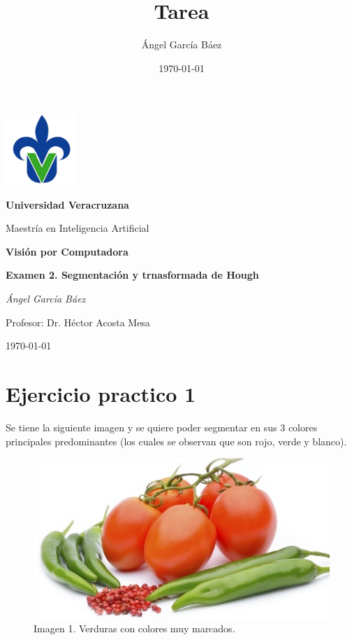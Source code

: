 \documentclass[11pt, letterpaper]{article}
\title{\bfseries Tarea}
\author{Ángel García Báez}
\date{\today}
\begin{document}
	
	\begin{titlepage}
		\centering
		\includegraphics[width=0.2\textwidth]{logo.png}\par
		\vspace{1cm}
		{\LARGE \bfseries Universidad Veracruzana \par}
		\vspace{1cm}
		{\Large Maestría en Inteligencia Artificial\par}
		\vspace{3cm}
		{\LARGE \bfseries Visión por Computadora \par}
		\vspace{1cm}
		{\Large \bfseries Examen 2. Segmentación y trnasformada de Hough \par}
		\vfill
		{\Large \textit{Ángel García Báez}\par}
		\vspace{1cm}
		{\Large Profesor: Dr. Héctor Acosta Mesa \par}
		\vfill
		{\Large \today \par}
	\end{titlepage}
	
	\newpage
	\tableofcontents
	\newpage
	
\section{Ejercicio practico 1}

Se tiene la siguiente imagen y se quiere poder segmentar en sus 3 colores principales predominantes (los cuales se observan que son rojo, verde y blanco).



\begin{figure}[h!]
	\centering
	\begin{minipage}{0.8\textwidth}
		\centering
		\includegraphics[width=\textwidth]{IMG/G1.jpg}
		\caption*{Imagen 1. Verduras con colores muy marcados.}
	\end{minipage}\hfill
\end{figure}
\end{document}
